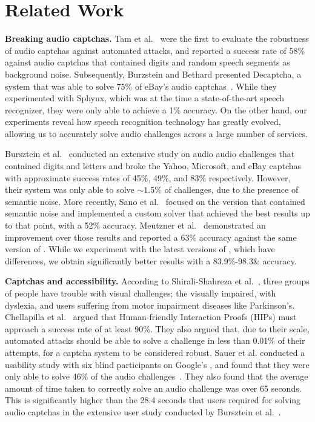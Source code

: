 \section{Related Work}
\label{sec:related}

\textbf{Breaking audio captchas.} Tam et al.~\cite{tam2008improving} were the 
first to evaluate the robustness of audio captchas against automated attacks,
and reported a success rate of 58\% against audio captchas that contained 
digits and random speech segments as background noise. Subsequently, 
Burzstein and Bethard presented Decaptcha, a system that was able to solve 75\%
of eBay's audio captchas~\cite{Bursztein2009}. While they experimented with Sphynx,
which was at the time a state-of-the-art speech recognizer, they were only able to 
achieve a 1\% accuracy. On the other hand, our experiments reveal how speech recognition
technology has greatly evolved, allowing us to accurately solve audio challenges
across a large number of services.

Bursztein et al.~\cite{bursztein2011failure} conducted an extensive study on audio audio 
challenges that contained digits and letters and broke the Yahoo, Microsoft, and eBay 
captchas with approximate success rates of 45\%, 49\%, and 83\% respectively. However, 
their system was only able to solve $\sim1.5\%$ of \re challenges, due to the presence 
of semantic noise. More recently, Sano et al.~\cite{Sano2013} focused on the \re
version that contained semantic noise and implemented a custom solver that achieved the best
results up to that point, with a 52\% accuracy. Meutzner et al.~\cite{meutzner2014using} demonstrated 
an improvement over those results and reported a 63\% accuracy against the same version of \re. While
we experiment with the latest versions of \re, which have differences, 
we obtain significantly better results with a 83.9\%-98.3\& accuracy.

\textbf{Captchas and accessibility.} According to Shirali-Shahreza et al.~\cite{shirali2011accessibility},
three groups of people have trouble with visual challenges; the visually impaired,
with dyslexia, and users suffering from motor impairment diseases like Parkinson's.
Chellapilla et al.~\cite{Chellapilla} argued that Human-friendly Interaction Proofs (HIPs)
must approach a success rate of at least 90\%. They also argued that, due to their scale, automated attacks
should be able to solve a challenge in less than 0.01\% of their attempts, for a captcha system to be considered
robust. Sauer et al. conducted a usability study with six blind participants on Google's \re, 
and found that they were only able to solve 46\% of the audio challenges~\cite{sauer2008towards}.
They also found that the average amount of time taken to correctly solve an audio challenge was over 65 seconds.
This is significantly higher than the 28.4 seconds that users required for solving audio captchas
in the extensive user study conducted by Bursztein et al.~\cite{captchas-are-hard}.

